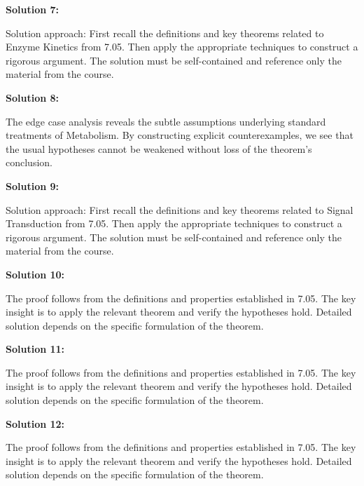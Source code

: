 \documentclass[12pt,a4paper]{exam}
\begin{document}
\vspace{0.5cm}

\textbf{Solution 7:}

Solution approach: First recall the definitions and key theorems related to Enzyme Kinetics from 7.05. Then apply the appropriate techniques to construct a rigorous argument. The solution must be self-contained and reference only the material from the course.

\vspace{0.5cm}

\textbf{Solution 8:}

The edge case analysis reveals the subtle assumptions underlying standard treatments of Metabolism. By constructing explicit counterexamples, we see that the usual hypotheses cannot be weakened without loss of the theorem's conclusion.

\vspace{0.5cm}

\textbf{Solution 9:}

Solution approach: First recall the definitions and key theorems related to Signal Transduction from 7.05. Then apply the appropriate techniques to construct a rigorous argument. The solution must be self-contained and reference only the material from the course.

\vspace{0.5cm}

\textbf{Solution 10:}

The proof follows from the definitions and properties established in 7.05. The key insight is to apply the relevant theorem and verify the hypotheses hold. Detailed solution depends on the specific formulation of the theorem.

\vspace{0.5cm}

\textbf{Solution 11:}

The proof follows from the definitions and properties established in 7.05. The key insight is to apply the relevant theorem and verify the hypotheses hold. Detailed solution depends on the specific formulation of the theorem.

\vspace{0.5cm}

\textbf{Solution 12:}

The proof follows from the definitions and properties established in 7.05. The key insight is to apply the relevant theorem and verify the hypotheses hold. Detailed solution depends on the specific formulation of the theorem.
\end{document}
